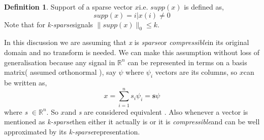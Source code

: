 \documentclass[12pt]{article}
\theoremstyle{definition}
\newtheorem{defn}{Definition}[section]
\def\compressible{\textit{compressible}\hspace{0.1in}}
\def\sparse{\textit{sparse}\hspace{0.1in}}
\def\ksparse{\textit{k-sparse}\hspace{0.1in}}
\def\x{$x$\hspace{0.1in}}
\begin{document}
\begin{defn}
 Support of a sparse vector \x i.e. $supp(x)$ is defined as,
 \begin{equation}
  supp(x)={i|x(i) \neq 0}
 \end{equation}
 Note that for \ksparse signals $\|supp(x)\|_0 \leq k$.
\end{defn}

In this discussion we are assuming that \textit{x} is \sparse or \compressible in its original domain and no transform
is needed. We can make this assumption without loss of generalisation because any signal in $\mathbb{R}^n$ can be 
represented in terms on a basis matrix( assumed orthonormal ), say $\psi$ where $\psi_i$ vectors are its columns, so \x can be written as,
\begin{equation}
 x = \sum_{i=1}^{n} s_i \psi_i = \textbf{s} \psi 
\end{equation}
where \textit{s} $\in \mathbb{R}^n$. So \x and \textit{s} are considered equivalent \cite{Baraniuk-CS}. Also whenever
a vector is mentioned as \ksparse then either it actually is or it is \compressible and can be well approximated 
by its \ksparse representation.
\end{document}
